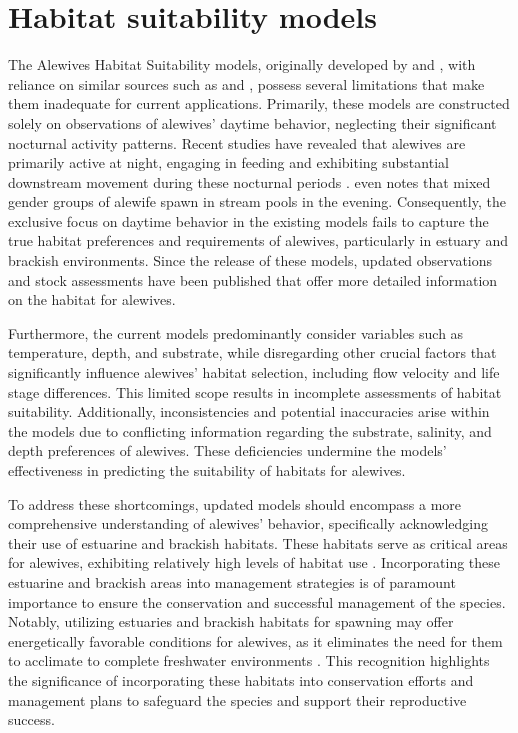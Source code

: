 \documentclass[
]{book}
\begin{document}
\hypertarget{habitat-suitability-models}{%
\section{Habitat suitability models}\label{habitat-suitability-models}}

The Alewives Habitat Suitability models, originally developed by \citet{brown_habitat_2000} and \citet{pardue_habitat_1983}, with reliance on similar sources such as \citet{bigelow_fishes_1953} and \citet{bigelow_bigelow_2002}, possess several limitations that make them inadequate for current applications. Primarily, these models are constructed solely on observations of alewives' daytime behavior, neglecting their significant nocturnal activity patterns. Recent studies have revealed that alewives are primarily active at night, engaging in feeding and exhibiting substantial downstream movement during these nocturnal periods \citep{janssen_will_1978, janssen_feeding_1980, mccartin_new_2019}. \citet{collette_fishes_2003} even notes that mixed gender groups of alewife spawn in stream pools in the evening. Consequently, the exclusive focus on daytime behavior in the existing models fails to capture the true habitat preferences and requirements of alewives, particularly in estuary and brackish environments. Since the release of these models, updated observations and stock assessments have been published that offer more detailed information on the habitat for alewives.

Furthermore, the current models predominantly consider variables such as temperature, depth, and substrate, while disregarding other crucial factors that significantly influence alewives' habitat selection, including flow velocity and life stage differences. This limited scope results in incomplete assessments of habitat suitability. Additionally, inconsistencies and potential inaccuracies arise within the models due to conflicting information regarding the substrate, salinity, and depth preferences of alewives. These deficiencies undermine the models' effectiveness in predicting the suitability of habitats for alewives.

To address these shortcomings, updated models should encompass a more comprehensive understanding of alewives' behavior, specifically acknowledging their use of estuarine and brackish habitats. These habitats serve as critical areas for alewives, exhibiting relatively high levels of habitat use \citep{mccartin_new_2019}. Incorporating these estuarine and brackish areas into management strategies is of paramount importance to ensure the conservation and successful management of the species. Notably, utilizing estuaries and brackish habitats for spawning may offer energetically favorable conditions for alewives, as it eliminates the need for them to acclimate to complete freshwater environments \citep{dimaggio_spawning_2015}. This recognition highlights the significance of incorporating these habitats into conservation efforts and management plans to safeguard the species and support their reproductive success.
\end{document}
